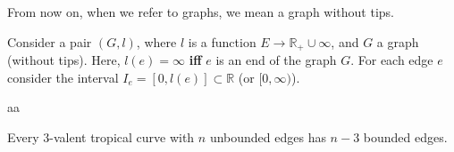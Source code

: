 \begin{remark}
    From now on, when we refer to graphs, we mean a graph without tips.
\end{remark}

\begin{definition}
    Consider a pair $(G,l)$, where $l$ is a function $E \to \mathbb{R}_{+} \cup \infty$, and $G$ a graph (without tips).
    Here, $l(e) = \infty$ \textbf{iff} $e$ is an end of the graph $G$.
For each edge $e$ consider the interval $I_{e} = [0,l(e)]\subset \mathbb{R}$ (or $[0,\infty)$).
\end{definition}

\begin{definition}
    aa
\end{definition}

\begin{definition}
    
\end{definition}

\begin{definition}
    
\end{definition}

\begin{definition}
    
\end{definition}

\begin{proposition}
    
\end{proposition}

\begin{definition}
    
\end{definition}

\begin{lemma}
    
\end{lemma}

\begin{lemma}
    Every $3$-valent tropical curve with $n$ unbounded edges has $n-3$ bounded edges.
\end{lemma}

\begin{remark}
    
\end{remark}

